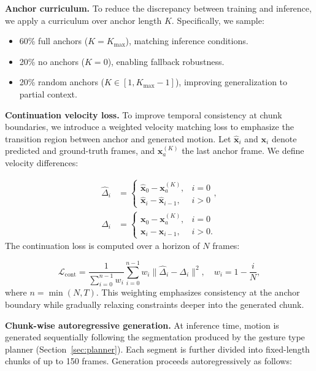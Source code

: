 \noindent \textbf{Anchor curriculum.}
To reduce the discrepancy between training and inference, we apply a curriculum over anchor length $K$.
Specifically, we sample:

\begin{itemize}[leftmargin=*]
    \item 60\% full anchors ($K = K_\text{max}$), matching inference conditions.
    \item 20\% no anchors ($K = 0$), enabling fallback robustness.
    \item 20\% random anchors ($K \in [1, K_\text{max}-1]$), improving generalization to partial context.
\end{itemize}

\noindent \textbf{Continuation velocity loss.}
To improve temporal consistency at chunk boundaries, we introduce a weighted velocity matching loss to emphasize the transition region between anchor and generated motion.
Let $\hat{\mathbf{x}}_i$ and $\mathbf{x}_i$ denote predicted and ground-truth frames, and $\mathbf{x}_a^{(K)}$ the last anchor frame.
We define velocity differences:

\begin{align}
\hat{\Delta}_i &=
\begin{cases}
\hat{\mathbf{x}}_0 - \mathbf{x}_a^{(K)}, & i = 0 \\
\hat{\mathbf{x}}_i - \hat{\mathbf{x}}_{i-1}, & i > 0
\end{cases}, \\
\Delta_i &=
\begin{cases}
\mathbf{x}_0 - \mathbf{x}_a^{(K)}, & i = 0 \\
\mathbf{x}_i - \mathbf{x}_{i-1}, & i > 0.
\end{cases}
\end{align}
The continuation loss is computed over a horizon of $N$ frames:

\begin{equation}
\mathcal{L}_\text{cont} =
\frac{1}{\sum_{i=0}^{n-1} w_i}
\sum_{i=0}^{n-1} w_i \|\hat{\Delta}_i - \Delta_i\|^2,
\quad w_i = 1 - \frac{i}{N},
\label{eq:cont}
\end{equation}
where $n = \min(N, T)$.
This weighting emphasizes consistency at the anchor boundary while gradually relaxing constraints deeper into the generated chunk.

\noindent \textbf{Chunk-wise autoregressive generation.}
At inference time, motion is generated sequentially following the segmentation produced by the gesture type planner (Section~\ref{sec:planner}).
Each segment is further divided into fixed-length chunks of up to 150 frames.
Generation proceeds autoregressively as follows:

